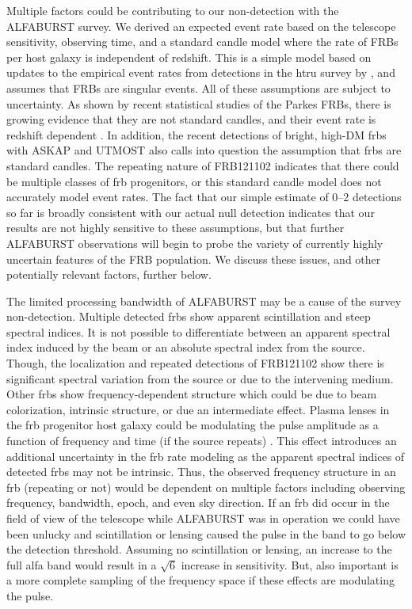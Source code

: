 \documentclass[a4paper,fleqn,usenatbib]{mnras}
\begin{document}
Multiple factors could be contributing to our non-detection with the ALFABURST
survey. We derived an expected event rate based on the telescope sensitivity,
observing time, and a standard candle model \citep{2013MNRAS.436L...5L} where
the rate of FRBs per host galaxy is independent of redshift. This is a simple
model based on updates to the empirical event rates from detections in the
\gls{htru} survey \citep{2013Sci...341...53T} by \cite{2016MNRAS.460.3370C},
and assumes that FRBs are singular events. All of these assumptions are subject
to uncertainty. As shown by recent statistical studies of the Parkes FRBs,
there is growing evidence that they are not  standard candles, and their event
rate is redshift dependent \citep{2016MNRAS.458..708C,ranethesis}.  In
addition, the recent detections of bright, high-DM \glspl{frb} with ASKAP
\citep{2017ApJ...841L..12B} and UTMOST \citep{2017MNRAS.468.3746C,atel10697}
also calls into question the assumption that \glspl{frb} are  standard candles.
The repeating nature of FRB121102 \citep{2016Natur.531..202S} indicates that
there could be multiple classes of \gls{frb} progenitors, or this standard
candle model does not accurately model event rates. The fact that our simple
estimate of 0--2 detections so far is broadly consistent with our actual null
detection indicates that our results are not highly sensitive to these
assumptions, but that further ALFABURST observations will begin to probe the
variety of currently highly uncertain features of the FRB population. We
discuss these issues, and other potentially relevant factors, further below.

The limited processing bandwidth of ALFABURST may be a cause of the survey
non-detection. Multiple detected \glspl{frb} show apparent scintillation and
steep spectral indices. It is not possible to differentiate between an apparent
spectral index induced by the beam or an absolute spectral index from the
source. Though, the localization and repeated detections of FRB121102 show there
is significant spectral variation from the source or due to the intervening
medium. Other \glspl{frb} show frequency-dependent structure which could be due
to beam colorization, intrinsic structure, or due an intermediate effect. Plasma
lenses in the \gls{frb} progenitor host galaxy could be modulating the pulse
amplitude as a function of frequency and time (if the source repeats)
\citep{2017ApJ...842...35C}. This effect introduces an additional uncertainty in
the \gls{frb} rate modeling as the apparent spectral indices of detected
\glspl{frb} may not be intrinsic. Thus, the observed frequency structure in an
\gls{frb} (repeating or not) would be dependent on multiple factors including
observing frequency, bandwidth, epoch, and even sky direction. If an \gls{frb}
did occur in the field of view of the telescope while ALFABURST was in operation
we could have been unlucky and scintillation or lensing caused the pulse in the
band to go below the detection threshold. Assuming no scintillation or lensing,
an increase to the full \gls{alfa} band would result in a $\sqrt{6}$ increase in
sensitivity. But, also important is a more complete sampling of the frequency
space if these effects are modulating the pulse.
\end{document}
